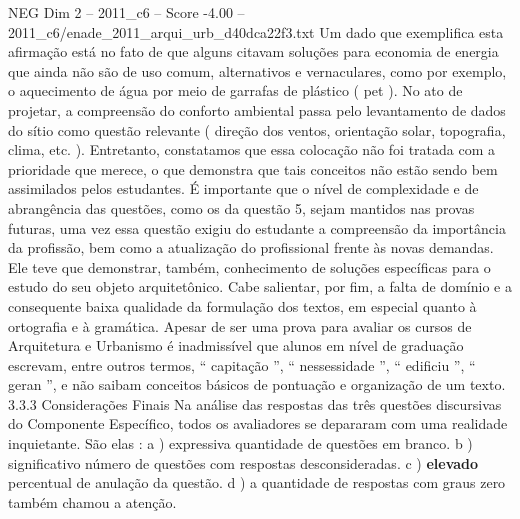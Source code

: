 \begin{textsample}{NEG Dim 2 – 2011\_c6 – Score -4.00 – 2011\_c6/enade\_2011\_arqui\_urb\_d40dca22f3.txt}
Um dado que exemplifica esta afirmação está no fato de que alguns citavam soluções para economia de energia que ainda não são de uso comum, alternativos e vernaculares, como por exemplo, o aquecimento de água por meio de garrafas de plástico ( pet ).
No ato de projetar, a compreensão do conforto ambiental passa pelo levantamento de dados do sítio como questão relevante ( direção dos ventos, orientação solar, topografia, clima, etc. ).
Entretanto, constatamos que essa colocação não foi tratada com a prioridade que merece, o que demonstra que tais conceitos não estão sendo bem assimilados pelos estudantes.
É importante que o nível de complexidade e de abrangência das questões, como os da questão 5, sejam mantidos nas provas futuras, uma vez essa questão exigiu do estudante a compreensão da importância da profissão, bem como a atualização do profissional frente às novas demandas.
Ele teve que demonstrar, também, conhecimento de soluções específicas para o estudo do seu objeto arquitetônico.
Cabe salientar, por fim, a falta de domínio e a consequente baixa qualidade da formulação dos textos, em especial quanto à ortografia e à gramática.
Apesar de ser uma prova para avaliar os cursos de Arquitetura e Urbanismo é inadmissível que alunos em nível de graduação escrevam, entre outros termos, “ capitação ”, “ nessessidade ”, “ edificiu ”, “ geran ”, e não saibam conceitos básicos de pontuação e organização de um texto. 3.3.3 Considerações Finais Na análise das respostas das três questões discursivas do Componente Específico, todos os avaliadores se depararam com uma realidade inquietante.
São elas : a ) expressiva quantidade de questões em branco. b ) significativo número de questões com respostas desconsideradas. c ) \textbf{elevado} percentual de anulação da questão. d ) a quantidade de respostas com graus zero também chamou a atenção.

\end{textsample}
